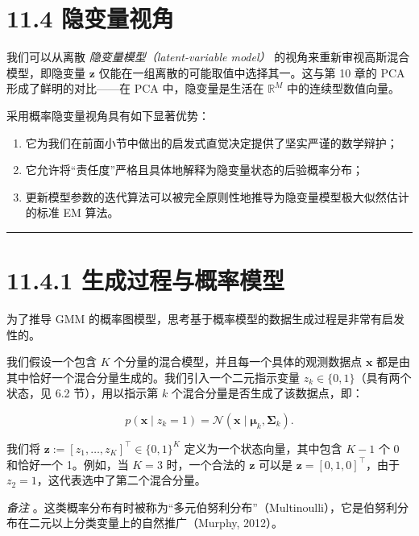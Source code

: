 \section*{11.4 隐变量视角}
\label{sec:11.4}

我们可以从离散 \emph{隐变量模型（latent-variable model）} 的视角来重新审视高斯混合模型，即隐变量 $ \boldsymbol{z} $ 仅能在一组离散的可能取值中选择其一。这与第 10 章的 PCA 形成了鲜明的对比——在 PCA 中，隐变量是生活在 $ \mathbb{R}^M $ 中的连续型数值向量。

采用概率隐变量视角具有如下显著优势：

\begin{enumerate}
\item 它为我们在前面小节中做出的启发式直觉决定提供了坚实严谨的数学辩护；
\item 它允许将“责任度”严格且具体地解释为隐变量状态的后验概率分布；
\item 更新模型参数的迭代算法可以被完全原则性地推导为隐变量模型极大似然估计的标准 EM 算法。
\end{enumerate}

\medskip\hrule\medskip

\section*{11.4.1 生成过程与概率模型}

为了推导 GMM 的概率图模型，思考基于概率模型的数据生成过程是非常有启发性的。

我们假设一个包含 $ K $ 个分量的混合模型，并且每一个具体的观测数据点 $ \boldsymbol{x} $ 都是由其中恰好一个混合分量生成的。我们引入一个二元指示变量 $ z_k \in \{0, 1\} $（具有两个状态，见 6.2 节），用以指示第 $ k $ 个混合分量是否生成了该数据点，即：

\begin{equation}
p(\boldsymbol{x} \mid z_k = 1) = \mathcal{N}\left(\boldsymbol{x} \mid \boldsymbol{\mu}_k, \boldsymbol{\Sigma}_k\right) .
\tag{11.58}
\end{equation}

我们将 $ \boldsymbol{z} := [z_1, \ldots, z_K]^\top \in \{0, 1\}^K $ 定义为一个状态向量，其中包含 $ K-1 $ 个 0 和恰好一个 1。例如，当 $ K = 3 $ 时，一个合法的 $ \boldsymbol{z} $ 可以是 $ \boldsymbol{z} = [0, 1, 0]^\top $，由于 $ z_2 = 1 $，这代表选中了第二个混合分量。

\emph{备注} 。这类概率分布有时被称为“多元伯努利分布”（Multinoulli），它是伯努利分布在二元以上分类变量上的自然推广（Murphy, 2012）。

